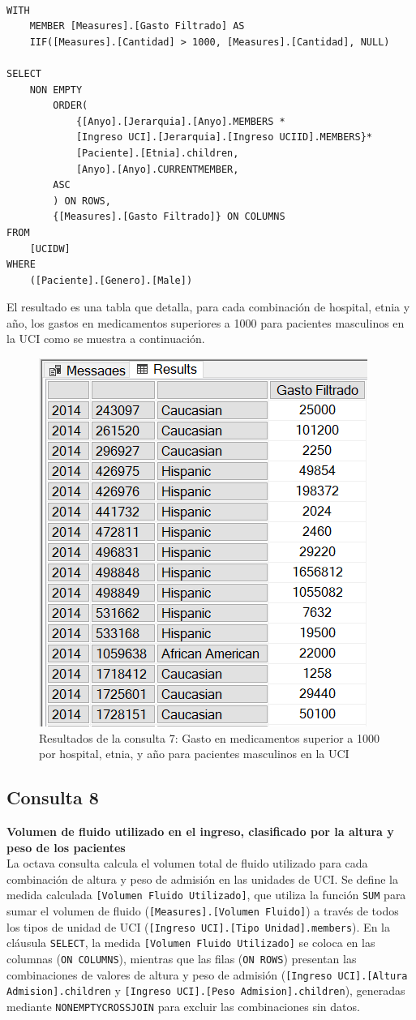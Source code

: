 \documentclass{article}
\begin{document}
\begin{lstlisting}[style=ddlstyle, label=lst:consulta7,caption=Consulta 7: Gasto en medicamentos superior a 1000 por hospital etnia y año para pacientes masculinos en la UCI]
	
WITH 
	MEMBER [Measures].[Gasto Filtrado] AS 
	IIF([Measures].[Cantidad] > 1000, [Measures].[Cantidad], NULL)

SELECT 
	NON EMPTY 
		ORDER(
			{[Anyo].[Jerarquia].[Anyo].MEMBERS *
			[Ingreso UCI].[Jerarquia].[Ingreso UCIID].MEMBERS}*
			[Paciente].[Etnia].children, 
			[Anyo].[Anyo].CURRENTMEMBER, 
		ASC
		) ON ROWS, 
		{[Measures].[Gasto Filtrado]} ON COLUMNS
FROM 
	[UCIDW]
WHERE 
	([Paciente].[Genero].[Male])
\end{lstlisting}

El resultado es una tabla que detalla, para cada combinación de hospital, etnia y año, los gastos en medicamentos superiores a 1000 para pacientes masculinos en la UCI como se muestra a continuación.

\begin{figure}[H]
	\centering
	\includegraphics[width=0.4\linewidth]{images/consulta7.png}
	\caption{Resultados de la consulta 7: Gasto en medicamentos superior a 1000 por hospital, etnia, y año para pacientes masculinos en la UCI}
	\label{fig:consulta7}
\end{figure}


\subsection{Consulta 8}

\textbf{Volumen de fluido utilizado en el ingreso, clasificado por la altura y peso de los pacientes}
\\

La octava consulta calcula el volumen total de fluido utilizado para cada combinación de altura y peso de admisión en las unidades de UCI. Se define la medida calculada \texttt{[Volumen Fluido Utilizado]}, que utiliza la función \texttt{SUM} para sumar el volumen de fluido (\texttt{[Measures].[Volumen Fluido]}) a través de todos los tipos de unidad de UCI (\texttt{[Ingreso UCI].[Tipo Unidad].members}). En la cláusula \texttt{SELECT}, la medida \texttt{[Volumen Fluido Utilizado]} se coloca en las columnas (\texttt{ON COLUMNS}), mientras que las filas (\texttt{ON ROWS}) presentan las combinaciones de valores de altura y peso de admisión (\texttt{[Ingreso UCI].[Altura Admision].children} y \texttt{[Ingreso UCI].[Peso Admision].children}), generadas mediante \texttt{NONEMPTYCROSSJOIN} para excluir las combinaciones sin datos. 
\end{document}

